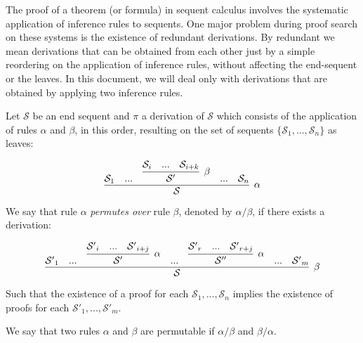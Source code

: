\begin{comment}
\begin{giselle}
I though it was better to separate the concepts of macro-rules and
permutability. First we introduce what are macro-rules and prove it's
completeness and after that we present the problem of permutation of rules and
show how macro-rules can help us solve this automatically.
\end{giselle}

\begin{vivek} 
Define the problem of permuting two rules: Given a side-formula
context, and two formulas. Forall possible ways of 
introducing...
\end{vivek}

\begin{giselle}
There is a good definition of permutations on sequent calculus here:
http://www.lix.polytechnique.fr/~nguenot/pub/sd09.pdf Should we follow this
notation and definitions? I think they differ from what was defined in your
thesis Vivek.

Are we defining this for specifications of sequent calculus systems only?
\end{giselle}
\end{comment}

The proof of a theorem (or formula) in sequent calculus involves the systematic
application of inference rules to sequents. One major problem during proof
search on these systems is the existence of redundant derivations. By redundant
we mean derivations that can be obtained from each other just by a simple
reordering on the application of inference rules, without affecting the
end-sequent or the leaves. In this document, we will deal only with derivations
that are obtained by applying two inference rules. 

\begin{definition}[Permutability]
Let $\mathcal{S}$ be an end sequent and $\pi$ a derivation of $\mathcal{S}$
which consists of the application of rules $\alpha$ and $\beta$, in this
order, resulting on the set of sequents $\{\mathcal{S}_1, ..., \mathcal{S}_n\}$ as
leaves:

\[
\infer[\alpha]{\mathcal{S}}
{
  \mathcal{S}_1 &
  ... &
  \infer[\beta]{\mathcal{S}'}{\mathcal{S}_i & ... & \mathcal{S}_{i+k}} &
  ... &
  \mathcal{S}_n
}
\]

We say that rule $\alpha$ \textit{permutes over} rule $\beta$, denoted by
$\alpha/\beta$, if there exists a derivation:

\[
\infer[\beta]{\mathcal{S}}
{
  \mathcal{S'}_1 &
  ... &
  \infer[\alpha]{\mathcal{S}'}{\mathcal{S'}_i & ... & \mathcal{S'}_{i+j}} &
  ... &
  \infer[\alpha]{\mathcal{S}''}{\mathcal{S'}_r & ... & \mathcal{S'}_{r+j}} &
  ... &
  \mathcal{S'}_m
}
\]

Such that the existence of a proof for each $\mathcal{S}_1, ..., \mathcal{S}_n$
implies the existence of proofs for each $\mathcal{S'}_1, ..., \mathcal{S'}_m$.

We say that two rules $\alpha$ and $\beta$ are permutable if $\alpha/\beta$ and
$\beta/\alpha$.

\end{definition}

